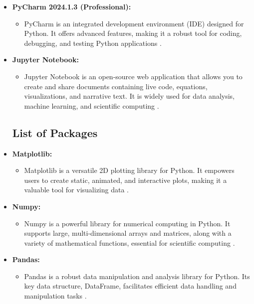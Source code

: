 \begin{itemize}
	\item \textbf{PyCharm 2024.1.3 (Professional):}
	\begin{itemize}
		\item PyCharm is an integrated development environment (IDE) designed for Python.
		It offers advanced features, making it a robust tool for coding,
		debugging, and testing Python applications \cite{Pycharm:2024}.
	\end{itemize}
	
	\item \textbf{Jupyter Notebook:}
	\begin{itemize}
		\item Jupyter Notebook is an open-source web application that allows you to
		create and share documents containing live code, equations, visualizations,
		and narrative text. It is widely used for data analysis, machine
		learning, and scientific computing \cite{Jupyter:2024}.
	\end{itemize}
	\subsection{ List of Packages}
	
	\item \textbf{Matplotlib:}
	\begin{itemize}
		\item Matplotlib is a versatile 2D plotting library for Python. It
		empowers users to create static, animated, and interactive plots, making
		it a valuable tool for visualizing data \cite{Matplotlib:2024}.
	\end{itemize}
	
	\item \textbf{Numpy:}
	\begin{itemize}
		\item Numpy is a powerful library for numerical computing in Python. It
		supports large, multi-dimensional arrays and matrices, along with a
		variety of mathematical functions, essential for scientific computing \cite{NumPy:2024}.
	\end{itemize}
	
	\item \textbf{Pandas:}
	\begin{itemize}
		\item Pandas is a robust data manipulation and analysis library for Python.
		Its key data structure, DataFrame, facilitates efficient data handling
		and manipulation tasks \cite{Pandas:2024}.
	\end{itemize}
	

\end{itemize}

